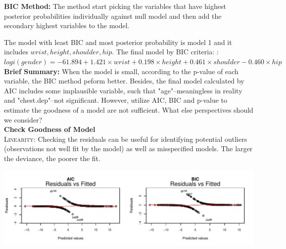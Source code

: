 \documentclass[11pt]{article}\usepackage[]{graphicx}\usepackage[]{color}
\makeatletter
\def\maxwidth{ %
  \ifdim\Gin@nat@width>\linewidth
    \linewidth
  \else
    \Gin@nat@width
  \fi
}
\newenvironment{knitrout}{}{} %
\makeatother
\begin{document}
\textbf{BIC Method:} The method start picking the variables that have highest posterior probabilities individually against null model and then add the secondary highest variables to the model.
\begin{table}[ht]
\centering
{}
\end{table}

The model with least BIC and most posterior probability is model 1 and it includes $wrist, height, shoulder, hip$. The final model by BIC criteria: : $logi(gender)=-61.894 + 1.421\times wrist+ 0.198\times height+0.461\times shoulder-0.460\times hip$\\

\textbf{Brief Summary:} When the model is small, according to the p-value of each variable, the BIC method peform better. Besides, the final model calculated by AIC includes some implausible variable, such that "age"--meaningless in reality and "chest.dep"--not significant. However, utilize AIC, BIC and p-value to estimate the goodness of a model are not sufficient. What else perspectives should we consider?\\

\textbf{Check Goodness of Model}\\
\textsc{Linearity:} Checking the residuals can be useful for identifying potential outliers (observations not well fit by the model) as well as misspecified models. The larger the deviance, the poorer the fit.



\begin{knitrout}
\color{fgcolor}
\includegraphics[width=\maxwidth]{figure/model_check} 

\end{knitrout}
\end{document}

